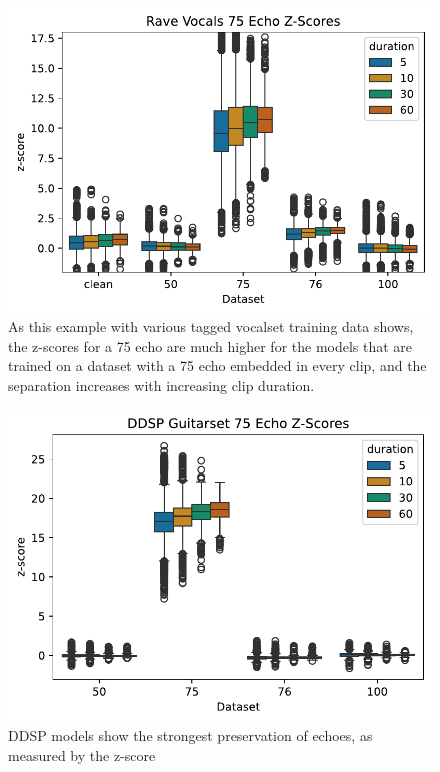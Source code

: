 \documentclass[letterpaper]{article} %
\begin{document}
\begin{figure}
    \centering
    \includegraphics[width=\columnwidth]{figs/RaveZScoreExamples.pdf}
    \caption{As this example with various tagged vocalset training data shows, the z-scores for a 75 echo are much higher for the models that are trained on a dataset with a 75 echo embedded in every clip, and the separation increases with increasing clip duration.}
    \label{fig:ravezscoreexamples}
\end{figure}


\begin{figure}
    \centering
    \includegraphics[width=\columnwidth]{figs/DDSPZScoreExamples.pdf}
    \caption{DDSP models show the strongest preservation of echoes, as measured by the z-score}
    \label{fig:ddspzscoreexamples}
\end{figure}
\end{document}
